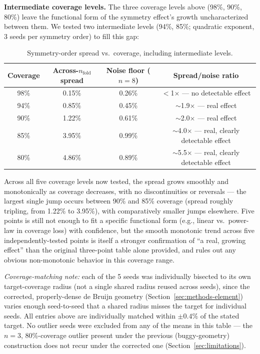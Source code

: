 \documentclass[11pt]{article}
\begin{document}
\textbf{Intermediate coverage levels.} The three coverage levels above (98\%, 90\%, 80\%) leave the functional form of the symmetry effect's growth uncharacterized between them. We tested two intermediate levels (94\%, 85\%; quadratic exponent, 3 seeds per symmetry order) to fill this gap:

\begin{table}[h]
\centering
\caption{Symmetry-order spread vs.\ coverage, including intermediate levels.}
\begin{tabular}{cccc}
\toprule
Coverage & Across-$n_{\text{fold}}$ spread & Noise floor ($n=8$) & Spread/noise ratio \\
\midrule
98\% & 0.15\% & 0.26\% & $<$1$\times$ --- no detectable effect \\
94\% & 0.85\% & 0.45\% & $\sim$1.9$\times$ --- real effect \\
90\% & 1.22\% & 0.61\% & $\sim$2.0$\times$ --- real effect \\
85\% & 3.95\% & 0.99\% & $\sim$4.0$\times$ --- real, clearly detectable effect \\
80\% & 4.86\% & 0.89\% & $\sim$5.5$\times$ --- real, clearly detectable effect \\
\bottomrule
\end{tabular}
\end{table}

Across all five coverage levels now tested, the spread grows smoothly and monotonically as coverage decreases, with no discontinuities or reversals --- the largest single jump occurs between 90\% and 85\% coverage (spread roughly tripling, from 1.22\% to 3.95\%), with comparatively smaller jumps elsewhere. Five points is still not enough to fit a specific functional form (e.g., linear vs.\ power-law in coverage loss) with confidence, but the smooth monotonic trend across five independently-tested points is itself a stronger confirmation of ``a real, growing effect'' than the original three-point table alone provided, and rules out any obvious non-monotonic behavior in this coverage range.

\textit{Coverage-matching note:} each of the 5 seeds was individually bisected to its own target-coverage radius (not a single shared radius reused across seeds), since the corrected, properly-dense de Bruijn geometry (Section~\ref{sec:methods-element}) varies enough seed-to-seed that a shared radius misses the target for individual seeds. All entries above are individually matched within $\pm0.4\%$ of the stated target. No outlier seeds were excluded from any of the means in this table --- the $n=3$, 80\%-coverage outlier present under the previous (buggy-geometry) construction does not recur under the corrected one (Section~\ref{sec:limitations}).
\end{document}
